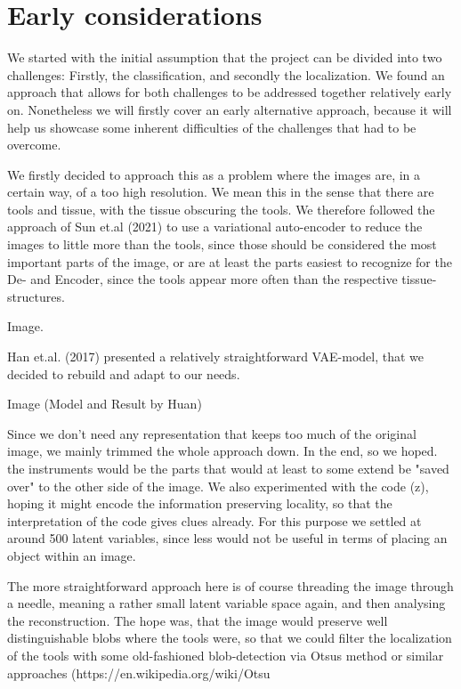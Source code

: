 \section{Early considerations}

We started with the initial assumption that the project can be divided into two challenges: Firstly, the classification, and secondly the localization. We found an approach that allows for both challenges to be addressed together relatively early on. Nonetheless we will firstly cover an early alternative approach, because it will help us showcase some inherent difficulties of the challenges that had to be overcome.

We firstly decided to approach this as a problem where the images are, in a certain way, of a too high resolution. We mean this in the sense that there are tools and tissue, with the tissue obscuring the tools. We therefore followed the approach of Sun et.al (2021) to use a variational auto-encoder to reduce the images to little more than the tools, since those should be considered the most important parts of the image, or are at least the parts easiest to recognize for the De- and Encoder, since the tools appear more often than the respective tissue-structures.

Image.

Han et.al. (2017) presented a relatively straightforward VAE-model, that we decided to rebuild and adapt to our needs. 

Image (Model and Result by Huan)

Since we don't need any representation that keeps too much of the original image, we mainly trimmed the whole approach down.
In the end, so we hoped. the instruments would be the parts that would at least to some extend be "saved over" to the other side of the image. We also experimented with the code (z), hoping it might encode the information preserving locality, so that the interpretation of the code gives clues already. For this purpose we settled at around 500 latent variables, since less would not be useful in terms of placing an object within an image. 

The more straightforward approach here is of course threading the image through a needle, meaning a rather small latent variable space again, and then analysing the reconstruction. The hope was, that the image would preserve well distinguishable blobs where the tools were, so that we could filter the localization of the tools with some old-fashioned blob-detection via Otsus method or similar approaches (https://en.wikipedia.org/wiki/Otsu%

